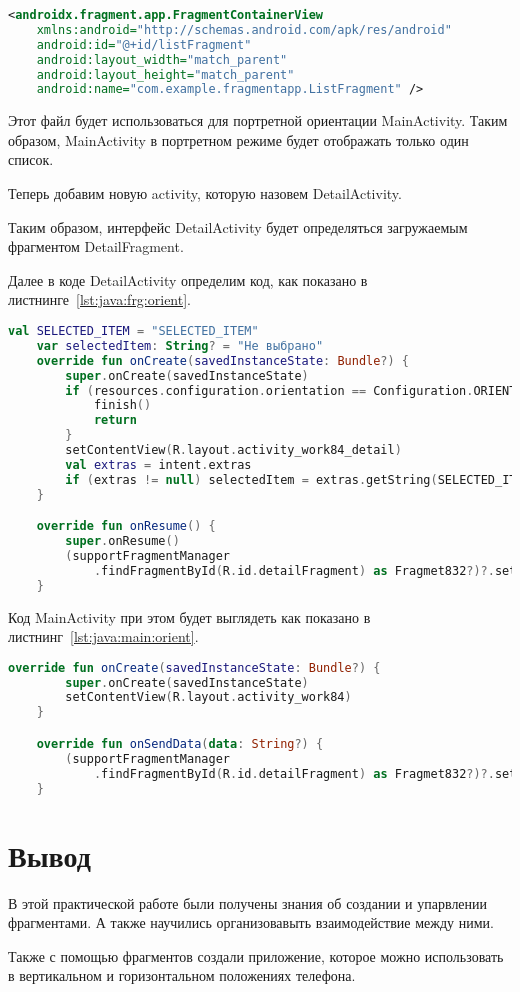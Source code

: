 \begin{lstlisting}[language=XML
	, caption=\leftline{}
	, label=lst:xml:actwthfrg
	]
<androidx.fragment.app.FragmentContainerView
	xmlns:android="http://schemas.android.com/apk/res/android"
	android:id="@+id/listFragment"
	android:layout_width="match_parent"
	android:layout_height="match_parent"
	android:name="com.example.fragmentapp.ListFragment" />
\end{lstlisting}

Этот файл будет использоваться для портретной ориентации MainActivity.
Таким образом, MainActivity в портретном режиме будет отображать только
один список.\par
Теперь добавим новую activity, которую назовем DetailActivity.\par
Таким образом, интерфейс DetailActivity будет определяться загружаемым
фрагментом DetailFragment.\par
Далее в коде DetailActivity определим код, как показано
в листнинге~\ref{lst:java:frg:orient}.

\begin{lstlisting}[language=Kotlin
	, caption=\leftline{}
	, label=lst:java:frg:orient
	]
val SELECTED_ITEM = "SELECTED_ITEM"
    var selectedItem: String? = "Не выбрано"
    override fun onCreate(savedInstanceState: Bundle?) {
        super.onCreate(savedInstanceState)
        if (resources.configuration.orientation == Configuration.ORIENTATION_LANDSCAPE) {
            finish()
            return
        }
        setContentView(R.layout.activity_work84_detail)
        val extras = intent.extras
        if (extras != null) selectedItem = extras.getString(SELECTED_ITEM)
    }

    override fun onResume() {
        super.onResume()
        (supportFragmentManager
            .findFragmentById(R.id.detailFragment) as Fragmet832?)?.setSelectedItem(selectedItem)
    }
\end{lstlisting}

Код MainActivity при этом будет выглядеть как показано
в листнинг~\ref{lst:java:main:orient}.

\begin{lstlisting}[language=Kotlin
	, caption=\leftline{}
	, label=lst:java:main:orient
	]
override fun onCreate(savedInstanceState: Bundle?) {
        super.onCreate(savedInstanceState)
        setContentView(R.layout.activity_work84)
    }

    override fun onSendData(data: String?) {
        (supportFragmentManager
            .findFragmentById(R.id.detailFragment) as Fragmet832?)?.setSelectedItem(data)
    }
\end{lstlisting}

\clearpage

\section*{\LARGE{Вывод}}
В этой практической работе были получены знания об создании и
упарвлении фрагментами. А также научились организовавыть взаимодействие
между ними.\par
Также с помощью фрагментов создали приложение, которое можно использовать
в вертикальном и горизонтальном положениях телефона.


